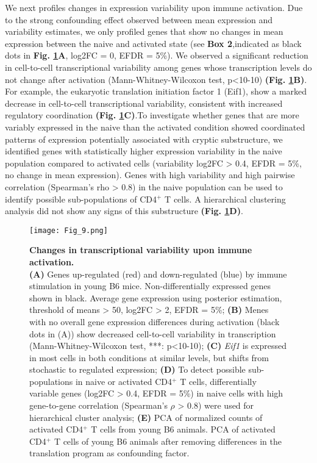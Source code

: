 We next profiles changes in expression variability upon immune activation. Due to the strong confounding effect observed between mean expression and variability estimates, we only profiled genes that show no changes in mean expression between the naive and activated state (see \textbf{Box 2},indicated as black dots in \textbf{Fig. \ref{fig1:immune_variability}A}, log2FC = 0, EFDR = 5\%). We observed a significant reduction in cell-to-cell transcriptional variability among genes whose transcription levels do not change after activation (Mann-Whitney-Wilcoxon test, p<10-10) \textbf{(Fig. \ref{fig1:immune_variability}B)}. For example, the eukaryotic translation initiation factor 1 (Eif1), show a marked decrease in cell-to-cell transcriptional variability, consistent with increased regulatory coordination \textbf{(Fig. \ref{fig1:immune_variability}C)}.To investigate whether genes that are more variably expressed in the naive than the activated condition showed coordinated patterns of expression potentially associated with cryptic substructure, we identified genes with statistically higher expression variability in the naive population compared to activated cells (variability log2FC > 0.4, EFDR = 5\%, no change in mean expression). Genes with high variability and high pairwise correlation (Spearman’s rho > 0.8) in the naive population can be used to identify possible sub-populations of CD4$^+$ T cells. A hierarchical clustering analysis did not show any signs of this substructure \textbf{(Fig. \ref{fig1:immune_variability}D)}. 

\newpage


\begin{figure}[!ht]
\centering
\texttt{[image: Fig\_9.png]}
\caption[Changes in transcriptional variability upon immune activation]{\textbf{Changes in transcriptional variability upon immune activation.}\\
\textbf{(A)} Genes up-regulated (red) and down-regulated (blue) by immune stimulation in young B6 mice. Non-differentially expressed genes shown in black. Average gene expression using posterior estimation, threshold of means > 50, log2FC > 2, EFDR = 5\%; \textbf{(B)} Menes with no overall gene expression differences during activation (black dots in (A)) show decreased cell-to-cell variability in transcription (Mann-Whitney-Wilcoxon test, ***: p<10-10); \textbf{(C)} \textit{Eif1} is expressed in most cells in both conditions at similar levels, but shifts from stochastic to regulated expression; \textbf{(D)} To detect possible sub-populations in naive or activated CD4$^+$ T cells, differentially variable genes (log2FC > 0.4, EFDR = 5\%) in naive cells with high gene-to-gene correlation (Spearman’s $\rho$ > 0.8) were used for hierarchical cluster analysis; \textbf{(E)} PCA of normalized counts of activated CD4$^+$ T cells from young B6 animals. PCA of activated CD4$^+$ T cells of young B6 animals after removing differences in the translation program as confounding factor.
}
\label{fig1:immune_variability}
\end{figure}

